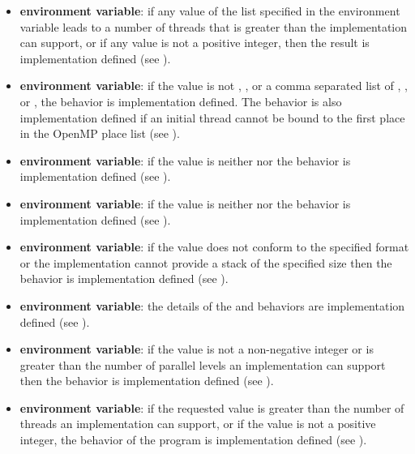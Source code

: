 \begin{itemize}
\item {} \textbf{environment variable}: if any value of the list specified in the
 environment variable leads to a number of threads that is
greater than the implementation can support, or if any value is not a positive integer,
then the result is implementation defined (see ).

\item {} \textbf{environment variable}: if the value is not , , or a
comma separated list of , , or , the behavior is
implementation defined. The behavior is also implementation defined if an initial
thread cannot be bound to the first place in the OpenMP place list (see
).

\item {} \textbf{environment variable}: if the value is neither
 nor  the behavior is implementation defined (see
).

\item {} \textbf{environment variable}: if the value is neither
 nor  the behavior is implementation defined (see
).

\item {} \textbf{environment variable}: if the value does not conform to the
specified format or the implementation cannot provide a stack of the specified size
then the behavior is implementation defined (see ).

\item {} \textbf{environment variable}: the details of the  and
 behaviors are implementation defined (see ).

\item {} \textbf{environment variable}: if the value is not a
non-negative integer or is greater than the number of parallel levels an implementation
can support then the behavior is implementation defined (see ).

\item {} \textbf{environment variable}: if the requested value is greater than
the number of threads an implementation can support, or if the value is not a positive
integer, the behavior of the program is implementation defined (see ).


\end{itemize}
